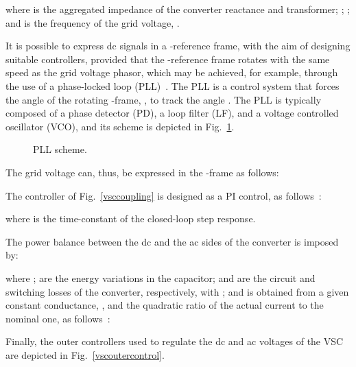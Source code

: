 \documentclass[journal, a4paper]{IEEEtran}
\begin{document}
where  is the aggregated impedance of the converter reactance
and transformer; ;
; and  is the frequency of the grid 
voltage, . 

It is possible to express dc signals in a -reference frame, with the aim of
designing suitable controllers, provided that the -reference frame rotates
with the same speed as the grid voltage phasor, which may be achieved, for
example, through the use of a phase-locked loop (PLL)~\cite{Cole:2010}.
The PLL is a control system that forces the angle of the rotating -frame, 
, to track the angle . The
PLL is typically composed of a phase detector (PD), a loop filter (LF), and
a voltage controlled oscillator (VCO), and its scheme is depicted in Fig.~\ref{pll}.
 \begin{figure}[h!]
  \begin{center}
    \psfrag{-}{\small{}}
    \caption{PLL scheme.}
    \label{pll}
  \end{center}
  \vspace{-0.4cm}
\end{figure}

The grid voltage  can, thus, be 
expressed in the -frame as follows:


The controller  of Fig.~\ref{vsccoupling} is
designed as a PI control, as follows~\cite{Chauduri:14}:


where  is the time-constant of the closed-loop step response.

The power balance between the
dc and the ac sides of the converter is imposed by:


where ; 
 are the energy variations in
the capacitor;
and 
are the circuit and switching losses of the converter, respectively,
with ; 
and  is obtained 
from a given constant conductance, , and the quadratic ratio of the actual 
current to the nominal one, as follows~\cite{acha:13}: 




Finally, the outer controllers used to regulate the dc and ac voltages of the VSC
are depicted in Fig.~\ref{vscoutercontrol}.  
\end{document}
